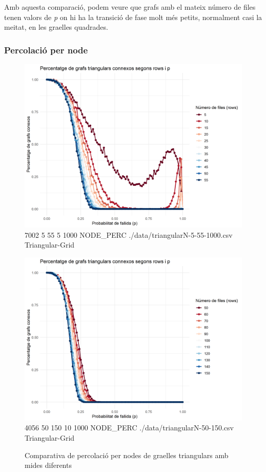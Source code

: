 \documentclass[a4paper]{article}
\begin{document}
	Amb aquesta comparació, podem veure que grafs amb el mateix número de files tenen valors de \textit{p} on hi ha la transició de fase molt més petits, normalment casi la meitat, en les graelles quadrades. 
	
	\subsubsection{Percolació per node}
	
	\begin{figure}[H]
		\centering
		\begin{minipage}{0.45\textwidth}
			\centering
			\includegraphics[width=\textwidth]{images/triangularN-5-55-1000}
			\footnotesize{7002 5 55 5 1000 NODE\_PERC ./data/triangularN-5-55-1000.csv Triangular-Grid}
		\end{minipage}
		\hfill
		\begin{minipage}{0.45\textwidth}
			\centering
			\includegraphics[width=\textwidth]{images/triangularE-50-150}
			\footnotesize{4056 50 150 10 1000 NODE\_PERC ./data/triangularN-50-150.csv Triangular-Grid}
		\end{minipage}
		\caption{Comparativa de percolació per nodes de graelles triangulars amb mides diferents}
		\label{fig:percolation_nodes_triangular}
	\end{figure}
	
\end{document}
